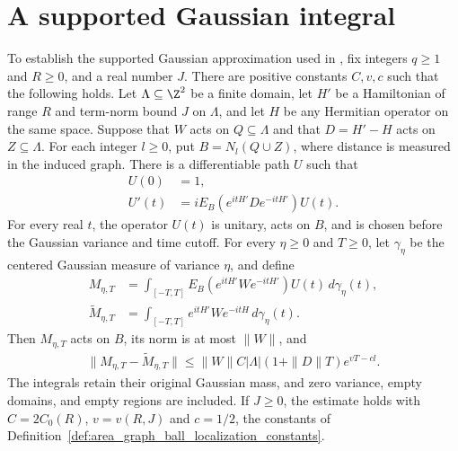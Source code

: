 \section{A supported Gaussian integral}

\begin{lemma}
    \label{thm:area_supported_gaussian_integral}
    \leanok
    To establish the supported Gaussian approximation used in
    \cite{OpenAI2026PolynomialPEPS}, fix integers $q\geq1$ and $R\geq0$,
    and a real number $J$.
    There are positive constants $C,v,c$ such that the following holds.
    Let $\Lambda\subseteq\Z^2$ be a finite domain, let $H'$ be a
    Hamiltonian of range $R$ and term-norm bound $J$ on $\Lambda$, and
    let $H$ be any Hermitian operator on the same space.
    Suppose that $W$ acts on $Q\subseteq\Lambda$ and that $D=H'-H$
    acts on $Z\subseteq\Lambda$. For each integer $l\geq0$, put
    $B=N_l(Q\cup Z)$, where distance is measured in the induced graph.
    There is a differentiable path $U$ such that
    \begin{align*}
        U(0)  & =1,                            \\
        U'(t) & =iE_B(e^{itH'}De^{-itH'})U(t).
    \end{align*}
    For every real $t$, the operator $U(t)$ is unitary, acts on $B$,
    and is chosen before the Gaussian variance and time cutoff.
    For every $\eta\geq0$ and $T\geq0$, let $\gamma_\eta$ be the centered
    Gaussian measure of variance $\eta$, and define
    \begin{align}
        M_{\eta,T}
         & =\int_{[-T,T]}E_B(e^{itH'}We^{-itH'})U(t)\,d\gamma_\eta(t),
        \label{eq:supported_gaussian_integral}
        \\
        \widetilde M_{\eta,T}
         & =\int_{[-T,T]}e^{itH'}We^{-itH}\,d\gamma_\eta(t).
        \label{eq:supported_gaussian_original}
    \end{align}
    Then $M_{\eta,T}$ acts on $B$, its norm is at most $\|W\|$, and
    \begin{align*}
        \|M_{\eta,T}-\widetilde M_{\eta,T}\|
        \leq \|W\|C|\Lambda|(1+\|D\|T)e^{vT-cl}.
    \end{align*}
    The integrals retain their original Gaussian mass, and zero variance,
    empty domains, and empty regions are included. If $J\geq0$, the
    estimate holds with $C=2C_0(R)$, $v=v(R,J)$ and $c=1/2$, the constants
    of Definition~\ref{def:area_graph_ball_localization_constants}.
\end{lemma}

